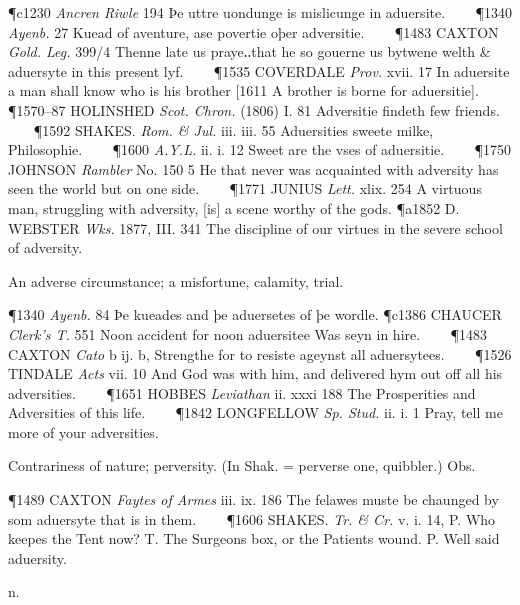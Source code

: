\begin{description}[wide, labelwidth=!, labelindent=0pt]
\begin{myenumerate}
\P c1230 \textit{Ancren Riwle} 194 Þe uttre uondunge is mislicunge in aduersite.    
\P 1340 \textit{Ayenb.} 27 Kuead of aventure, ase povertie oþer adversitie.    
\P 1483 CAXTON \textit{Gold. Leg.} 399/4 Thenne late us praye‥that he so gouerne us bytwene welth \& aduersyte in this present lyf.    
\P 1535 COVERDALE \textit{Prov.} xvii. 17 In aduersite a man shall know who is his brother [1611 A brother is borne for aduersitie].    
\P 1570–87 HOLINSHED \textit{Scot. Chron.} (1806) I. 81 Adversitie findeth few friends.    
\P 1592 SHAKES. \textit{Rom. \& Jul.} iii. iii. 55 Aduersities sweete milke, Philosophie.    
\P 1600 \textit{A.Y.L.} ii. i. 12 Sweet are the vses of aduersitie.    
\P 1750 JOHNSON \textit{Rambler} No. 150 5 He that never was acquainted with adversity has seen the world but on one side.    
\P 1771 JUNIUS \textit{Lett.} xlix. 254 A virtuous man, struggling with adversity, [is] a scene worthy of the gods.
\P a1852 D. WEBSTER \textit{Wks.} 1877, III. 341 The discipline of our virtues in the severe school of adversity.

 An adverse circumstance; a misfortune, calamity, trial. 

\P 1340 \textit{Ayenb.} 84 Þe kueades and þe aduersetes of þe wordle.
\P c1386 CHAUCER \textit{Clerk's T.} 551 Noon accident for noon aduersitee Was seyn in hire.    
\P 1483 CAXTON \textit{Cato} b ij. b, Strengthe for to resiste ageynst all aduersytees.    
\P 1526 TINDALE \textit{Acts} vii. 10 And God was with him, and delivered hym out off all his adversities.    
\P 1651 HOBBES \textit{Leviathan} ii. xxxi 188 The Prosperities and Adversities of this life.    
\P 1842 LONGFELLOW \textit{Sp. Stud.} ii. i. 1 Pray, tell me more of your adversities.

 Contrariness of nature; perversity. (In Shak. = perverse one, quibbler.) Obs. 

\P 1489 CAXTON \textit{Faytes of Armes} iii. ix. 186 The felawes muste be chaunged by som aduersyte that is in them.    
\P 1606 SHAKES. \textit{Tr. \& Cr.} v. i. 14, P. Who keepes the Tent now? T. The Surgeons box, or the Patients wound. P. Well said aduersity.
\end{myenumerate}


  n.

\noindent  {}


\end{description}

